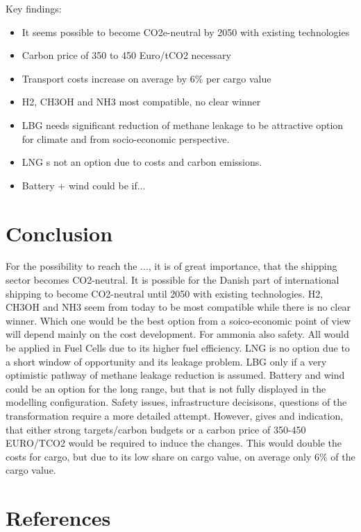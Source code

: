 \documentclass[article]{elsarticle}
\begin{document}
Key findings:
\begin{itemize}
    \item It seems possible to become CO2e-neutral by 2050 with existing technologies
    \item Carbon price of 350 to 450 Euro/tCO2 necessary
    \item Transport costs increase on average by 6\% per cargo value
    \item H2, CH3OH and NH3 most compatible, no clear winner
    \item LBG needs significant reduction of methane leakage to be attractive option for climate and from socio-economic perspective.
    \item LNG s not an option due to costs and carbon emissions.
    \item Battery + wind could be if...
\end{itemize}

\section{Conclusion}
For the possibility to reach the ..., it is of great importance, that the shipping sector becomes CO2-neutral. It is possible for the Danish part of international shipping to become CO2-neutral until 2050 with existing technologies. H2, CH3OH and NH3 seem from today to be most compatible while there is no clear winner. Which one would be the best option from a soico-economic point of view will depend mainly on the cost development. For ammonia also safety. All would be applied in Fuel Cells due to its higher fuel efficiency. LNG is no option due to a short window of opportunity and its leakage problem. LBG only if a very optimistic pathway of methane leakage reduction is assumed. Battery and wind could be an option for the long range, but that is not fully displayed in the modelling configuration. Safety issues, infrastructure decisisons, questions of the transformation require a more detailed attempt.
However, gives and indication, that either strong targets/carbon budgets or a carbon price of 350-450 EURO/TCO2 would be required to induce the changes. This would double the costs for cargo, but due to its low share on cargo value, on average only 6\% of the cargo value.

\section*{References}


\end{document}
